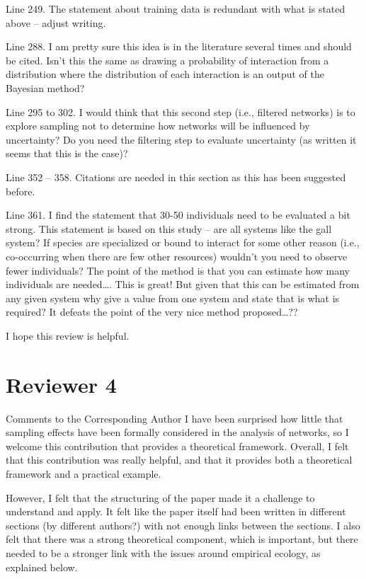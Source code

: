 \documentclass[12pt]{letter}
\begin{document}
Line 249.  The statement about training data is redundant with what is stated above – adjust writing.

Line 288.  I am pretty sure this idea is in the literature several times and should be cited.  Isn’t this the same as drawing a probability of interaction from a distribution where the distribution of each interaction is an output of the Bayesian method?

Line 295 to 302.  I would think that this second step (i.e., filtered networks) is to explore sampling not to determine how networks will be influenced by uncertainty?  Do you need the filtering step to evaluate uncertainty (as written it seems that this is the case)?


Line 352 – 358.  Citations are needed in this section as this has been suggested before.

Line 361.  I find the statement that 30-50 individuals need to be evaluated a bit strong.  This statement is based on this study – are all systems like the gall system?  If species are specialized or bound to interact for some other reason (i.e., co-occurring when there are few other resources) wouldn’t you need to observe fewer individuals?  The point of the method is that you can estimate how many individuals are needed…. This is great!  But given that this can be estimated from any given system why give a value from one system and state that is what is required?  It defeats the point of the very nice method proposed…??

I hope this review is helpful.  


\section*{Reviewer 4}

Comments to the Corresponding Author
I have been surprised how little that sampling effects have been formally considered in the analysis of networks, so I welcome this contribution that provides a theoretical framework. Overall, I felt that this contribution was really helpful, and that it provides both a theoretical framework and a practical example.

However, I felt that the structuring of the paper made it a challenge to understand and apply. It felt like the paper itself had been written in different sections (by different authors?) with not enough links between the sections. I also felt that there was a strong theoretical component, which is important, but there needed to be a stronger link with the issues around empirical ecology, as explained below.
\end{document}
